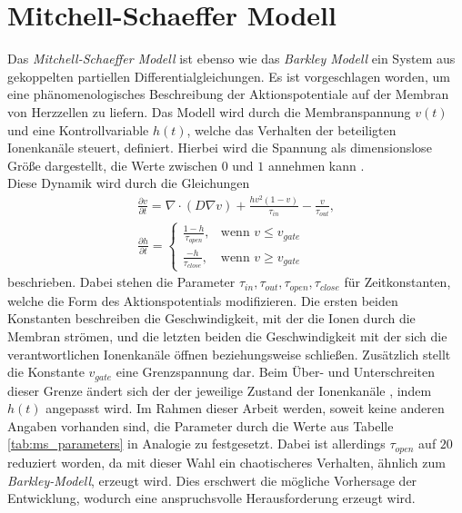 \section{Mitchell-Schaeffer Modell}
Das \textit{Mitchell-Schaeffer Modell} ist ebenso wie das \textit{Barkley Modell} ein System aus gekoppelten partiellen Differentialgleichungen. Es ist vorgeschlagen worden, um eine phänomenologisches Beschreibung der Aktionspotentiale auf der Membran von Herzzellen zu liefern. Das Modell wird durch die Membranspannung $v(t)$ und eine Kontrollvariable $h(t)$, welche das Verhalten der beteiligten Ionenkanäle steuert, definiert. Hierbei wird die Spannung als dimensionslose Größe dargestellt, die Werte zwischen $0$ und $1$ annehmen kann \citep{mitchell2003two}.\\

Diese Dynamik wird durch die Gleichungen 
\begin{equation}
\begin{gathered}
\frac{\partial v}{\partial t} = \nabla \cdot (D \nabla v) + \frac{h v^2(1-v)}{\tau_{in}} - \frac{v}{\tau_{out}},\\
\frac{\partial h}{\partial t} =
\begin{cases}
	\frac{1-h}{\tau_{open}},& \text{wenn } v \leq v_{gate}\\
    \frac{-h}{\tau_{close}},& \text{wenn } v \geq v_{gate}
\end{cases}
\end{gathered}
\end{equation}
beschrieben. Dabei stehen die Parameter $\tau_{in}, \tau_{out}, \tau_{open}, \tau_{close}$ für Zeitkonstanten, welche die Form des Aktionspotentials modifizieren. Die ersten beiden Konstanten beschreiben die Geschwindigkeit, mit der die Ionen durch die Membran strömen, und die letzten beiden die Geschwindigkeit mit der sich die verantwortlichen Ionenkanäle öffnen beziehungsweise schließen. Zusätzlich stellt die Konstante $v_{gate}$ eine Grenzspannung dar. Beim Über- und Unterschreiten dieser Grenze ändert sich der der jeweilige Zustand der Ionenkanäle , indem $h(t)$ angepasst wird. Im Rahmen dieser Arbeit werden, soweit keine anderen Angaben vorhanden sind, die Parameter durch die Werte aus Tabelle \ref{tab:ms_parameters} in Analogie zu \citep{mitchell2003two} festgesetzt. Dabei ist allerdings $\tau_{open}$ auf $20$ \citep[S. 134ff.]{bartocci2016computational} reduziert worden, da mit dieser Wahl ein chaotischeres Verhalten, ähnlich zum \textit{Barkley-Modell}, erzeugt wird. Dies erschwert die mögliche Vorhersage der Entwicklung, wodurch eine anspruchsvolle Herausforderung erzeugt wird.\\

